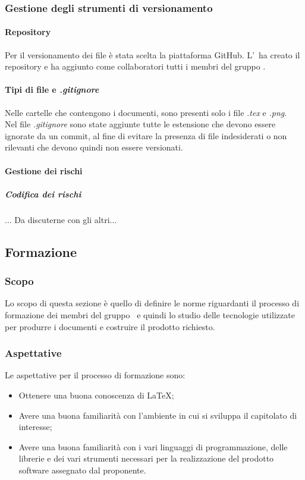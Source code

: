     \subsubsection{Gestione degli strumenti di versionamento}
      \paragraph{Repository}
        Per il versionamento dei file è stata scelta la piattaforma GitHub\glo. L'\roleAdministrator\ ha creato il repository e ha aggiunto 
        come collaboratori tutti i membri del gruppo \groupName.

      \paragraph{Tipi di file e \textit{.gitignore}}
        Nelle cartelle che contengono i documenti, sono presenti solo i file \textit{.tex} e \textit{.png}.\\
        Nel file \textit{.gitignore} sono state aggiunte tutte le estensione che devono essere ignorate da un commit, al fine di evitare la presenza di file indesiderati 
        o non rilevanti che devono quindi non essere versionati.
      \paragraph {Gestione dei rischi}
      \subparagraph {Codifica dei rischi}
        ... Da discuterne con gli altri...



        \subsection{Formazione} \label{subsection: formazione}
        \subsubsection {Scopo}
        Lo scopo di questa sezione è quello di definire le norme riguardanti il processo di formazione dei membri del gruppo \groupName\ e quindi lo studio delle tecnologie utilizzate per produrre i documenti e costruire il prodotto richiesto.
        \subsubsection {Aspettative}
        Le aspettative per il processo di formazione sono:
        \begin {itemize}
          \item Ottenere una buona conoscenza di \LaTeX;
          \item Avere una buona familiarità con l'ambiente in cui si sviluppa il capitolato di interesse;
          \item Avere una buona familiarità con i vari linguaggi di programmazione, delle librerie e dei vari strumenti necessari per la realizzazione del prodotto software assegnato dal proponente.
        \end {itemize}
